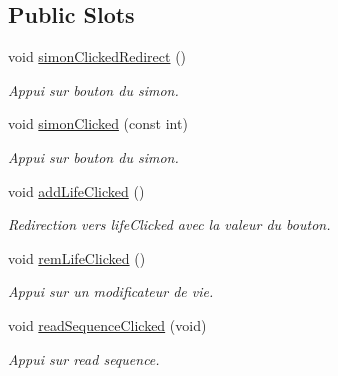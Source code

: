 \subsection*{Public Slots}
\begin{DoxyCompactItemize}
\item 
void \hyperlink{class_super_simon_af495f2a329d2966c2f265cb46753a13d}{simon\+Clicked\+Redirect} ()
\begin{DoxyCompactList}\small\item\em Appui sur bouton du simon. \end{DoxyCompactList}\item 
\mbox{\label{class_super_simon_accceee26094ef9d22fe8b3934f34e607}} 
void \hyperlink{class_super_simon_accceee26094ef9d22fe8b3934f34e607}{simon\+Clicked} (const int)
\begin{DoxyCompactList}\small\item\em Appui sur bouton du simon. \end{DoxyCompactList}\item 
\mbox{\label{class_super_simon_a5a68e15b3f3322e083dc89dc6379cc91}} 
void \hyperlink{class_super_simon_a5a68e15b3f3322e083dc89dc6379cc91}{add\+Life\+Clicked} ()
\begin{DoxyCompactList}\small\item\em Redirection vers life\+Clicked avec la valeur du bouton. \end{DoxyCompactList}\item 
\mbox{\label{class_super_simon_a56553d0c5ff5bfa19ef7a6b6bbbac672}} 
void \hyperlink{class_super_simon_a56553d0c5ff5bfa19ef7a6b6bbbac672}{rem\+Life\+Clicked} ()
\begin{DoxyCompactList}\small\item\em Appui sur un modificateur de vie. \end{DoxyCompactList}\item 
\mbox{\label{class_super_simon_aa0b9fa2f2d980039b2cc3b5e5f98c51f}} 
void \hyperlink{class_super_simon_aa0b9fa2f2d980039b2cc3b5e5f98c51f}{read\+Sequence\+Clicked} (void)
\begin{DoxyCompactList}\small\item\em Appui sur read sequence. \end{DoxyCompactList}\item 

\end{DoxyCompactItemize}
